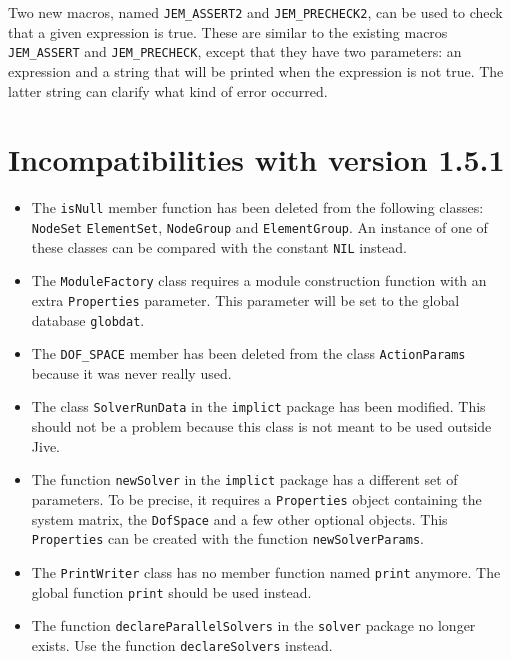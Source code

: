 \documentclass[a4paper]{article}
\newcommand{\Code}[1]{\texttt{#1}}
\begin{document}
Two new macros, named \Code{JEM\_ASSERT2} and \Code{JEM\_PRECHECK2}, can
be used to check that a given expression is true. These are similar to
the existing macros \Code{JEM\_ASSERT} and \Code{JEM\_PRECHECK}, except
that they have two parameters: an expression and a string that will be
printed when the expression is not true. The latter string can clarify
what kind of error occurred.


\section{Incompatibilities with version 1.5.1}

\begin{itemize}

  \item The \Code{isNull} member function has been deleted from the
    following classes: \Code{NodeSet} \Code{ElementSet},
    \Code{NodeGroup} and \Code{ElementGroup}. An instance of one of these
    classes can be compared with the constant \Code{NIL} instead.

  \item The \Code{ModuleFactory} class requires a module construction
    function with an extra \Code{Properties} parameter. This parameter
    will be set to the global database \Code{globdat}.

  \item The \Code{DOF\_SPACE} member has been deleted from the class
    \Code{ActionParams} because it was never really used.

  \item The class \Code{SolverRunData} in the \Code{implict} package has
    been modified. This should not be a problem because this class is not
    meant to be used outside Jive.

  \item The function \Code{newSolver} in the \Code{implict} package has a
    different set of parameters. To be precise, it requires a
    \Code{Properties} object containing the system matrix, the
    \Code{DofSpace} and a few other optional objects. This
    \Code{Properties} can be created with the function
    \Code{newSolverParams}.

  \item The \Code{PrintWriter} class has no member function named
    \Code{print} anymore. The global function \Code{print} should be used
    instead.

  \item The function \Code{declareParallelSolvers} in the \Code{solver}
    package no longer exists. Use the function \Code{declareSolvers}
    instead.

\end{itemize}
\end{document}
